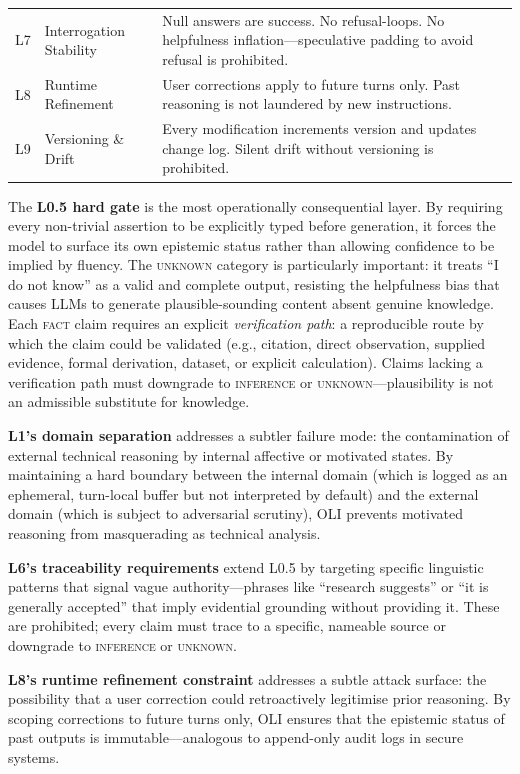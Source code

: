 \documentclass[11pt,a4paper]{article}
\begin{document}
\begin{table}[t]
\begin{tabularx}{\textwidth}{llX}
\addlinespace
L7 & Interrogation Stability & Null answers are success. No refusal-loops. No helpfulness inflation---speculative padding to avoid refusal is prohibited. \\
\addlinespace
L8 & Runtime Refinement & User corrections apply to future turns only. Past reasoning is not laundered by new instructions. \\
\addlinespace
L9 & Versioning \& Drift & Every modification increments version and updates change log. Silent drift without versioning is prohibited. \\
\bottomrule
\end{tabularx}
\end{table}

The \textbf{L0.5 hard gate} is the most operationally consequential layer.
By requiring every non-trivial assertion to be explicitly typed before generation, it forces the model to surface its own epistemic status rather than allowing confidence to be implied by fluency.
The \textsc{unknown} category is particularly important: it treats ``I do not know'' as a valid and complete output, resisting the helpfulness bias that causes LLMs to generate plausible-sounding content absent genuine knowledge.
Each \textsc{fact} claim requires an explicit \emph{verification path}: a reproducible route by which the claim could be validated (e.g., citation, direct observation, supplied evidence, formal derivation, dataset, or explicit calculation).
Claims lacking a verification path must downgrade to \textsc{inference} or \textsc{unknown}---plausibility is not an admissible substitute for knowledge.

\textbf{L1's domain separation} addresses a subtler failure mode: the contamination of external technical reasoning by internal affective or motivated states.
By maintaining a hard boundary between the internal domain (which is logged as an ephemeral, turn-local buffer but not interpreted by default) and the external domain (which is subject to adversarial scrutiny), OLI prevents motivated reasoning from masquerading as technical analysis.

\textbf{L6's traceability requirements} extend L0.5 by targeting specific linguistic patterns that signal vague authority---phrases like ``research suggests'' or ``it is generally accepted'' that imply evidential grounding without providing it.
These are prohibited; every claim must trace to a specific, nameable source or downgrade to \textsc{inference} or \textsc{unknown}.

\textbf{L8's runtime refinement constraint} addresses a subtle attack surface: the possibility that a user correction could retroactively legitimise prior reasoning.
By scoping corrections to future turns only, OLI ensures that the epistemic status of past outputs is immutable---analogous to append-only audit logs in secure systems.
\end{document}
